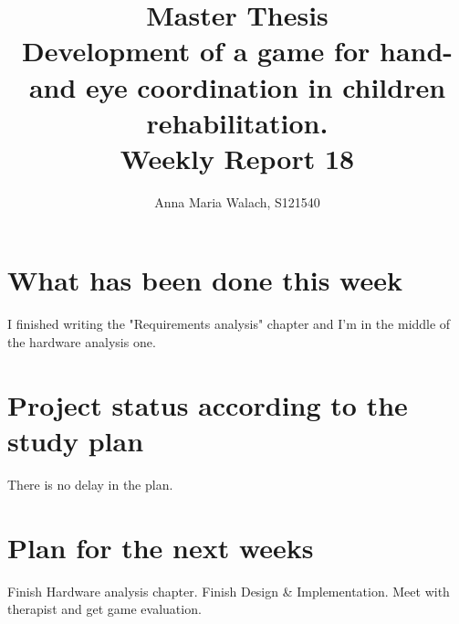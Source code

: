 \documentclass[10pt,a4paper]{article}
\title{{Master Thesis\\[0.5em]}
       {\bf \huge Development of a game for hand- and eye coordination in children rehabilitation.\\[0.5em]}
       {\bf Weekly Report 18}}
\author{Anna Maria Walach, S121540}
\begin{document}
\maketitle

\section*{What has been done this week}
I finished writing the "Requirements analysis" chapter and I'm in the middle of the hardware analysis one. 

\section*{Project status according to the study plan}
There is no delay in the plan.

\section*{Plan for the next weeks}
Finish Hardware analysis chapter. Finish Design \& Implementation. Meet with therapist and get game evaluation. 



\end{document}
